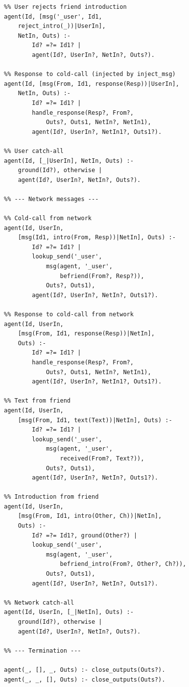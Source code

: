 \begin{verbatim}
%% User rejects friend introduction
agent(Id, [msg('_user', Id1,
    reject_intro(_))|UserIn],
    NetIn, Outs) :-
        Id? =?= Id1? |
        agent(Id?, UserIn?, NetIn?, Outs?).

%% Response to cold-call (injected by inject_msg)
agent(Id, [msg(From, Id1, response(Resp))|UserIn],
    NetIn, Outs) :-
        Id? =?= Id1? |
        handle_response(Resp?, From?,
            Outs?, Outs1, NetIn?, NetIn1),
        agent(Id?, UserIn?, NetIn1?, Outs1?).

%% User catch-all
agent(Id, [_|UserIn], NetIn, Outs) :-
    ground(Id?), otherwise |
    agent(Id?, UserIn?, NetIn?, Outs?).

%% --- Network messages ---

%% Cold-call from network
agent(Id, UserIn,
    [msg(Id1, intro(From, Resp))|NetIn], Outs) :-
        Id? =?= Id1? |
        lookup_send('_user',
            msg(agent, '_user',
                befriend(From?, Resp?)),
            Outs?, Outs1),
        agent(Id?, UserIn?, NetIn?, Outs1?).

%% Response to cold-call from network
agent(Id, UserIn,
    [msg(From, Id1, response(Resp))|NetIn],
    Outs) :-
        Id? =?= Id1? |
        handle_response(Resp?, From?,
            Outs?, Outs1, NetIn?, NetIn1),
        agent(Id?, UserIn?, NetIn1?, Outs1?).

%% Text from friend
agent(Id, UserIn,
    [msg(From, Id1, text(Text))|NetIn], Outs) :-
        Id? =?= Id1? |
        lookup_send('_user',
            msg(agent, '_user',
                received(From?, Text?)),
            Outs?, Outs1),
        agent(Id?, UserIn?, NetIn?, Outs1?).

%% Introduction from friend
agent(Id, UserIn,
    [msg(From, Id1, intro(Other, Ch))|NetIn],
    Outs) :-
        Id? =?= Id1?, ground(Other?) |
        lookup_send('_user',
            msg(agent, '_user',
                befriend_intro(From?, Other?, Ch?)),
            Outs?, Outs1),
        agent(Id?, UserIn?, NetIn?, Outs1?).

%% Network catch-all
agent(Id, UserIn, [_|NetIn], Outs) :-
    ground(Id?), otherwise |
    agent(Id?, UserIn?, NetIn?, Outs?).

%% --- Termination ---

agent(_, [], _, Outs) :- close_outputs(Outs?).
agent(_, _, [], Outs) :- close_outputs(Outs?).
\end{verbatim}

